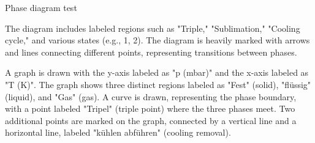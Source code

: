 Phase diagram test  

The diagram includes labeled regions such as "Triple," "Sublimation," "Cooling cycle," and various states (e.g., 1, 2). The diagram is heavily marked with arrows and lines connecting different points, representing transitions between phases.

A graph is drawn with the y-axis labeled as "p (mbar)" and the x-axis labeled as "T (K)". The graph shows three distinct regions labeled as "Fest" (solid), "flüssig" (liquid), and "Gas" (gas). A curve is drawn, representing the phase boundary, with a point labeled "Tripel" (triple point) where the three phases meet. Two additional points are marked on the graph, connected by a vertical line and a horizontal line, labeled "kühlen abführen" (cooling removal).